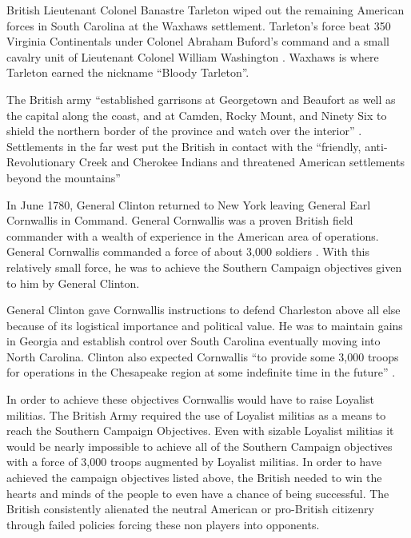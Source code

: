British Lieutenant Colonel Banastre Tarleton wiped out the remaining American
forces in South Carolina at the Waxhaws settlement.  Tarleton's force beat 350
Virginia Continentals under Colonel Abraham Buford's command and a small
cavalry unit of Lieutenant Colonel William Washington \cite[7]{weigley_partisan_1970}.  Waxhaws is
where Tarleton earned the nickname ``Bloody Tarleton''. \cite[20]{moncure_cowpens_1996}

The British army ``established garrisons at Georgetown and Beaufort as well as
the capital along the coast, and at Camden, Rocky Mount, and Ninety Six to
shield the northern border of the province and watch over the interior''
\cite[10]{weigley_partisan_1970}.  Settlements in the far west put the British in contact with the
``friendly, anti-Revolutionary Creek and Cherokee Indians and threatened
American settlements beyond the mountains'' \cite[10]{weigley_partisan_1970}

In June 1780, General Clinton returned to New York leaving General Earl
Cornwallis in Command.  General Cornwallis was a proven British field commander
with a wealth of experience in the American area of operations.  General
Cornwallis commanded a force  of about 3,000 soldiers \cite[51]{woodward_comparative_2002}.  With this
relatively small force, he was to achieve the Southern Campaign objectives
given to him by General Clinton.   

General Clinton gave Cornwallis instructions to defend Charleston above all
else because of its logistical importance and political value.  He was to
maintain gains in Georgia and establish control over South Carolina eventually
moving into North Carolina.  Clinton also expected Cornwallis ``to provide some
3,000 troops for operations in the Chesapeake region at some indefinite time in
the future'' \cite[51]{woodward_comparative_2002}.

In order to achieve these objectives Cornwallis would have to raise Loyalist
militias.  The British Army required the use of Loyalist militias as a means to
reach the Southern Campaign Objectives.  Even with sizable Loyalist militias it
would be nearly impossible to achieve all of the Southern Campaign objectives
with a force of 3,000 troops augmented by Loyalist militias.   In order to have
achieved the campaign objectives listed above, the British needed to win the
hearts and minds of the people to even have a chance of being successful.  The
British consistently alienated the neutral American or pro-British citizenry
through failed policies forcing these non players into opponents.

